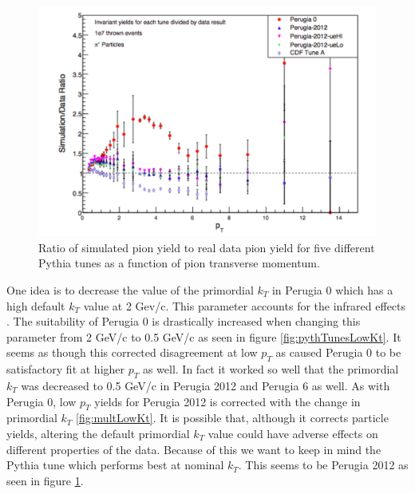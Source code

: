 \documentclass[abstract = on,listof=totoc, bibliography=totoc]{scrreprt}
\begin{document}
\begin{figure}
\begin{center}
\includegraphics[width = .77\textwidth]{piPlusPythTunes}
\caption[]{Ratio of simulated pion yield to real data pion yield for five different Pythia tunes as a function of pion transverse momentum.}
\label{fig:piPlusPythTunes}
\end{center}
\end{figure}

One idea is to decrease the value of the primordial $k_T$ in Perugia 0 which has a high default $k_T$ value at 2 Gev/c. This parameter accounts for the infrared effects \cite{pythTunes}. The suitability of Perugia 0 is drastically increased when changing this parameter from 2 GeV/c to 0.5 GeV/c as seen in figure \ref{fig:pythTunesLowKt}. It seems as though this corrected disagreement at low $p_T$ as caused Perugia 0 to be satisfactory fit at higher $p_T$ as well. In fact it worked so well that the primordial $k_T$ was decreased to 0.5 GeV/c in Perugia 2012 and Perugia 6 as well. As with Perugia 0, low $p_T$ yields for Perugia 2012 is corrected with the change in primordial $k_T$ \ref{fig:multLowKt}. It is possible that, although it corrects particle yields, altering the default primordial $k_T$ value could have adverse effects on different properties of the data. Because of this we want to keep in mind the Pythia tune which performs best at nominal $k_T$. This seems to be Perugia 2012 as seen in figure \ref{fig:piPlusPythTunes}.
\end{document}
